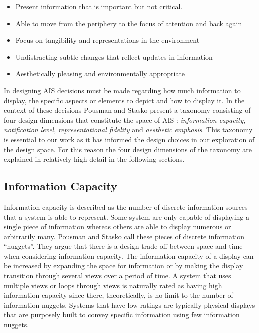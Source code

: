 \vspace{12pt}
\begin{itemize}
	\item Present information that is important but not critical.
	\item Able to move from the periphery to the focus of attention and back again
	\item Focus on tangibility and representations in the environment
	\item Undistracting subtle changes that reflect updates in information
	\item Aesthetically pleasing and environmentally appropriate
\end{itemize}
\vspace{12pt}

In designing AIS decisions must be made regarding how much information to display, the specific aspects or elements to depict and how to display it. In the context of these decisions Pousman and Stasko present a taxonomy consisting of four design dimensions that constitute the space of AIS \cite{pousman2006taxonomy}: \emph{information capacity}, \emph{notification level}, \emph{representational fidelity} and \emph{aesthetic emphasis}. This taxonomy is essential to our work as it has informed the design choices in our exploration of the design space. For this reason the four design dimensions of the taxonomy are explained in relatively high detail in the following sections.

\subsection{Information Capacity}
Information capacity is described as the number of discrete information sources that a system is able to represent. Some system are only capable of displaying a single piece of information whereas others are able to display numerous or arbitrarily many. Pousman and Stasko call these pieces of discrete information “nuggets”. They argue that there is a design trade-off between space and time when considering information capacity. The information capacity of a display can be increased by expanding the space for information or by making the display transition through several views over a period of time. A system that uses multiple views or loops through views is naturally rated as having high information capacity since there, theoretically, is no limit to the number of information nuggets. Systems that have low ratings are typically physical displays that are purposely built to convey specific information using few information nuggets.

